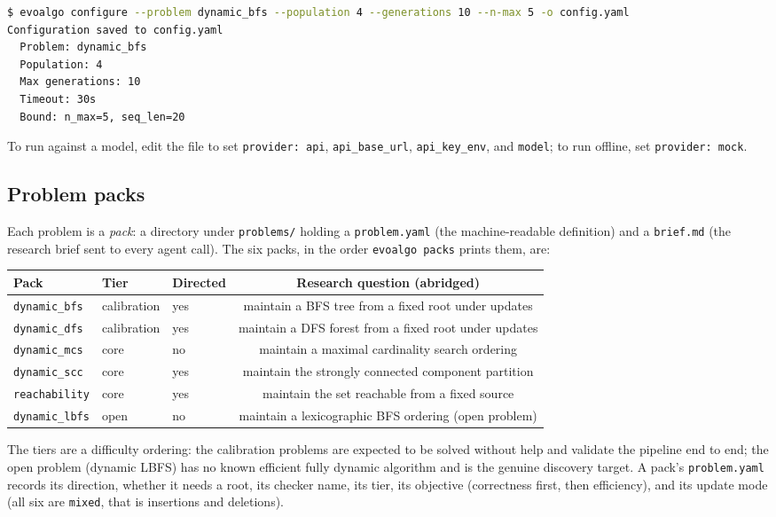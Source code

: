 \begin{lstlisting}[language=bash, basicstyle=\ttfamily\small]
$ evoalgo configure --problem dynamic_bfs --population 4 --generations 10 --n-max 5 -o config.yaml
Configuration saved to config.yaml
  Problem: dynamic_bfs
  Population: 4
  Max generations: 10
  Timeout: 30s
  Bound: n_max=5, seq_len=20
\end{lstlisting}

To run against a model, edit the file to set \texttt{provider: api},
\texttt{api\_base\_url}, \texttt{api\_key\_env}, and \texttt{model}; to run
offline, set \texttt{provider: mock}.

\subsection{Problem packs}

Each problem is a \emph{pack}: a directory under \texttt{problems/} holding a
\texttt{problem.yaml} (the machine-readable definition) and a \texttt{brief.md}
(the research brief sent to every agent call). The six packs, in the order
\texttt{evoalgo packs} prints them, are:

\begin{center}
\footnotesize
\setlength{\tabcolsep}{5pt}
\begin{tabular}{@{}lllc@{}}
\toprule
Pack & Tier & Directed & Research question (abridged) \\
\midrule
\texttt{dynamic\_bfs} & calibration & yes & maintain a BFS tree from a fixed root under updates \\
\texttt{dynamic\_dfs} & calibration & yes & maintain a DFS forest from a fixed root under updates \\
\texttt{dynamic\_mcs} & core & no & maintain a maximal cardinality search ordering \\
\texttt{dynamic\_scc} & core & yes & maintain the strongly connected component partition \\
\texttt{reachability} & core & yes & maintain the set reachable from a fixed source \\
\texttt{dynamic\_lbfs} & open & no & maintain a lexicographic BFS ordering (open problem) \\
\bottomrule
\end{tabular}
\end{center}

The tiers are a difficulty ordering: the calibration problems are expected to
be solved without help and validate the pipeline end to end; the open problem
(dynamic LBFS) has no known efficient fully dynamic algorithm and is the genuine
discovery target. A pack's \texttt{problem.yaml} records its direction, whether
it needs a root, its checker name, its tier, its objective (correctness first,
then efficiency), and its update mode (all six are \texttt{mixed}, that is
insertions and deletions).

